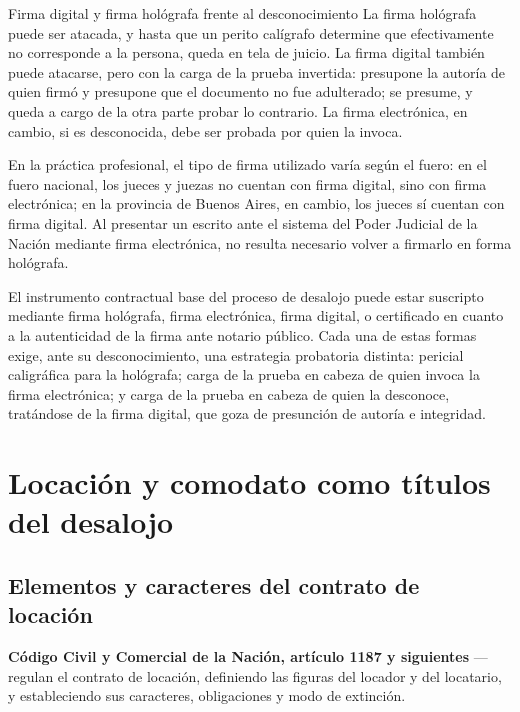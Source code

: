 \documentclass[12pt,oneside]{book}
\begin{document}
\begin{example}{Firma digital y firma hológrafa frente al desconocimiento}
La firma hológrafa puede ser atacada, y hasta que un perito calígrafo determine que efectivamente no corresponde a la persona, queda en tela de juicio. La firma digital también puede atacarse, pero con la carga de la prueba invertida: presupone la autoría de quien firmó y presupone que el documento no fue adulterado; se presume, y queda a cargo de la otra parte probar lo contrario. La firma electrónica, en cambio, si es desconocida, debe ser probada por quien la invoca.
\end{example}

\begin{note}
En la práctica profesional, el tipo de firma utilizado varía según el fuero: en el fuero nacional, los jueces y juezas no cuentan con firma digital, sino con firma electrónica; en la provincia de Buenos Aires, en cambio, los jueces sí cuentan con firma digital. Al presentar un escrito ante el sistema del Poder Judicial de la Nación mediante firma electrónica, no resulta necesario volver a firmarlo en forma hológrafa.
\end{note}

\begin{important}
El instrumento contractual base del proceso de desalojo puede estar suscripto mediante firma hológrafa, firma electrónica, firma digital, o certificado en cuanto a la autenticidad de la firma ante notario público. Cada una de estas formas exige, ante su desconocimiento, una estrategia probatoria distinta: pericial caligráfica para la hológrafa; carga de la prueba en cabeza de quien invoca la firma electrónica; y carga de la prueba en cabeza de quien la desconoce, tratándose de la firma digital, que goza de presunción de autoría e integridad.
\end{important}

\chapter{Locación y comodato como títulos del desalojo}
\label{cap:locacion}

\section{Elementos y caracteres del contrato de locación}

\begin{normacitada}
\textbf{Código Civil y Comercial de la Nación, artículo 1187 y siguientes} --- regulan el contrato de locación, definiendo las figuras del locador y del locatario, y estableciendo sus caracteres, obligaciones y modo de extinción.
\end{normacitada}
\end{document}

